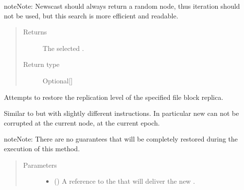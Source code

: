 \documentclass[letterpaper,10pt,english]{sphinxmanual}
\begin{document}
\begin{fulllineitems}
\begin{fulllineitems}
\begin{sphinxadmonition}{note}{Note:}
Newscast should always return a random node, thus iteration
should not be used, but this search is more efficient and readable.
\end{sphinxadmonition}
\begin{quote}\begin{description}
\item[{Returns}] \leavevmode
The selected .

\item[{Return type}] \leavevmode
Optional{[}{\hyperref[\detokenize{app.domain:app.domain.network_nodes.NewscastNode}]{}}{]}

\end{description}\end{quote}

\end{fulllineitems}


\begin{fulllineitems}
\label{\detokenize{app.domain:app.domain.network_nodes.NewscastNode.replicate_part}}
Attempts to restore the replication level of the specified file
block replica.

Similar to  but with
slightly different instructions. In particular new 
can not be corrupted at the current node, at the current epoch.

\begin{sphinxadmonition}{note}{Note:}
There are no guarantees that
{\hyperref[\detokenize{app:app.environment_settings.REPLICATION_LEVEL}]{}} will be
completely restored during the execution of this method.
\end{sphinxadmonition}
\begin{quote}\begin{description}
\item[{Parameters}] \leavevmode\begin{itemize}
\item {} 
 ({\hyperref[\detokenize{app:app.type_hints.ClusterType}]{}}) \textendash{} A reference to the
{\hyperref[\detokenize{app.domain:app.domain.cluster_groups.Cluster}]{}} that will
deliver the new .


\end{itemize}
\end{description}
\end{quote}
\end{fulllineitems}
\end{fulllineitems}
\end{document}

